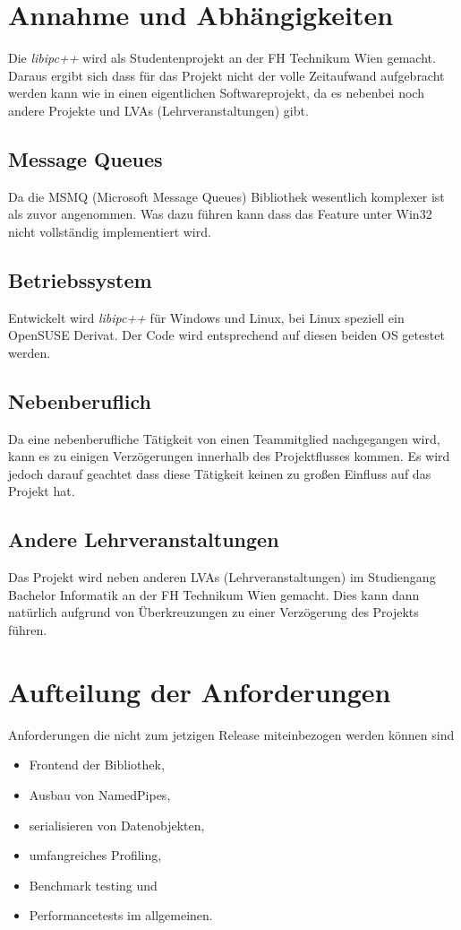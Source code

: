 \documentclass[a4paper]{book}
\begin{document}
\section{Annahme und Abhängigkeiten}
Die \textit{libipc++} wird als Studentenprojekt an der FH Technikum Wien gemacht. Daraus ergibt sich dass für das Projekt nicht der volle Zeitaufwand aufgebracht werden kann wie in einen eigentlichen Softwareprojekt, da es nebenbei noch andere Projekte und LVAs (Lehrveranstaltungen) gibt.

\subsection{Message Queues}
Da die MSMQ (Microsoft Message Queues) Bibliothek wesentlich komplexer ist als zuvor angenommen. Was dazu führen kann dass das Feature unter Win32 nicht vollständig implementiert wird.

\subsection{Betriebssystem}
Entwickelt wird \textit{libipc++} für Windows und Linux, bei Linux speziell ein OpenSUSE Derivat. Der Code wird entsprechend auf diesen beiden OS getestet werden.

\subsection{Nebenberuflich}
Da eine nebenberufliche Tätigkeit von einen Teammitglied nachgegangen wird, kann es zu einigen Verzögerungen innerhalb des Projektflusses kommen. Es wird jedoch darauf geachtet dass diese Tätigkeit keinen zu großen Einfluss auf das Projekt hat.

\subsection{Andere Lehrveranstaltungen}
Das Projekt wird neben anderen LVAs (Lehrveranstaltungen) im Studiengang Bachelor Informatik an der FH Technikum Wien gemacht. Dies kann dann natürlich aufgrund von Überkreuzungen zu einer Verzögerung des Projekts führen.

\section{Aufteilung der Anforderungen}
Anforderungen die nicht zum jetzigen Release miteinbezogen werden können sind
\begin{itemize}
\item Frontend der Bibliothek,
\item Ausbau von NamedPipes,
\item serialisieren von Datenobjekten,
\item umfangreiches Profiling,
\item Benchmark testing und
\item Performancetests im allgemeinen.
\end{itemize}
\end{document}
